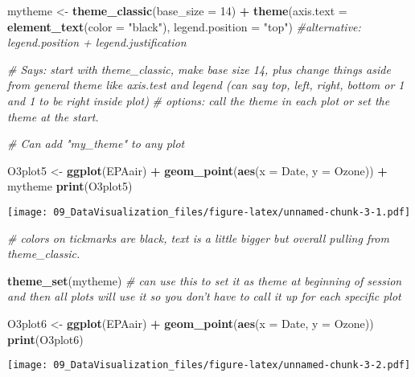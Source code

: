 \documentclass[]{article}
\newenvironment{Shaded}{\begin{snugshade}}{\end{snugshade}}
\newcommand{\KeywordTok}[1]{\textcolor[rgb]{0.13,0.29,0.53}{\textbf{#1}}}
\newcommand{\DataTypeTok}[1]{\textcolor[rgb]{0.13,0.29,0.53}{#1}}
\newcommand{\DecValTok}[1]{\textcolor[rgb]{0.00,0.00,0.81}{#1}}
\newcommand{\StringTok}[1]{\textcolor[rgb]{0.31,0.60,0.02}{#1}}
\newcommand{\CommentTok}[1]{\textcolor[rgb]{0.56,0.35,0.01}{\textit{#1}}}
\newcommand{\OperatorTok}[1]{\textcolor[rgb]{0.81,0.36,0.00}{\textbf{#1}}}
\newcommand{\NormalTok}[1]{#1}
\begin{document}
\begin{Shaded}
\begin{Highlighting}[]
\NormalTok{mytheme <-}\StringTok{ }\KeywordTok{theme_classic}\NormalTok{(}\DataTypeTok{base_size =} \DecValTok{14}\NormalTok{) }\OperatorTok{+}
\StringTok{  }\KeywordTok{theme}\NormalTok{(}\DataTypeTok{axis.text =} \KeywordTok{element_text}\NormalTok{(}\DataTypeTok{color =} \StringTok{"black"}\NormalTok{), }
        \DataTypeTok{legend.position =} \StringTok{"top"}\NormalTok{) }\CommentTok{#alternative: legend.position + legend.justification}

\CommentTok{# Says: start with theme_classic, make base size 14, plus change things aside from general theme like axis.test and legend (can say top, left, right, bottom or 1 and 1 to be right inside plot)}
\CommentTok{# options: call the theme in each plot or set the theme at the start. }

\CommentTok{# Can add "my_theme" to any plot}

\NormalTok{O3plot5 <-}\StringTok{ }\KeywordTok{ggplot}\NormalTok{(EPAair) }\OperatorTok{+}
\StringTok{  }\KeywordTok{geom_point}\NormalTok{(}\KeywordTok{aes}\NormalTok{(}\DataTypeTok{x =}\NormalTok{ Date, }\DataTypeTok{y =}\NormalTok{ Ozone)) }\OperatorTok{+}
\StringTok{  }\NormalTok{mytheme}
\KeywordTok{print}\NormalTok{(O3plot5)  }
\end{Highlighting}
\end{Shaded}

\texttt{[image: 09\_DataVisualization\_files/figure-latex/unnamed-chunk-3-1.pdf]}

\begin{Shaded}
\begin{Highlighting}[]
\CommentTok{# colors on tickmarks are black, text is a little bigger but overall pulling from theme_classic. }

\KeywordTok{theme_set}\NormalTok{(mytheme)}
\CommentTok{# can use this to set it as theme at beginning of session and then all plots will use it so you don't have to call it up for each specific plot}

\NormalTok{O3plot6 <-}\StringTok{ }\KeywordTok{ggplot}\NormalTok{(EPAair) }\OperatorTok{+}
\StringTok{  }\KeywordTok{geom_point}\NormalTok{(}\KeywordTok{aes}\NormalTok{(}\DataTypeTok{x =}\NormalTok{ Date, }\DataTypeTok{y =}\NormalTok{ Ozone))}
\KeywordTok{print}\NormalTok{(O3plot6)  }
\end{Highlighting}
\end{Shaded}

\texttt{[image: 09\_DataVisualization\_files/figure-latex/unnamed-chunk-3-2.pdf]}
\end{document}
